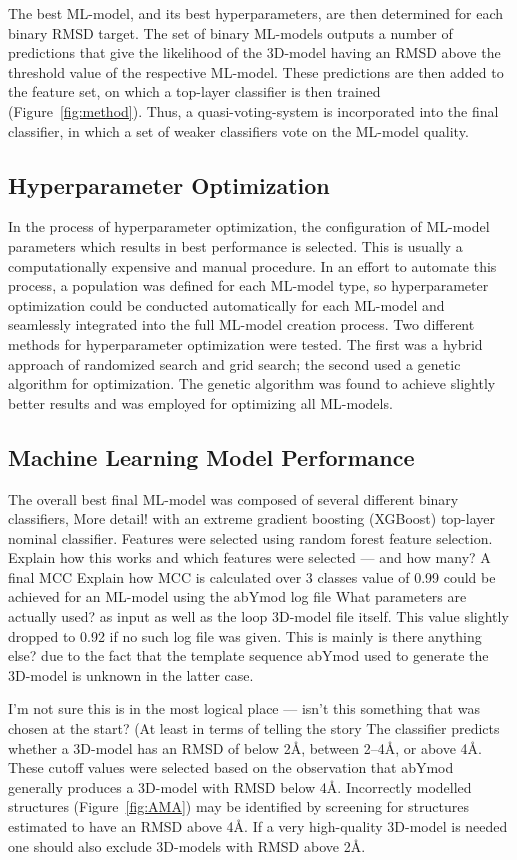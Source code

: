 \documentclass[12pt]{article}
\newcommand{\lilian}[1]{ {\color{red}{\bfseries Lilian:} #1}}
\begin{document}
The best ML-model, and its best hyperparameters, are then determined for
each binary RMSD target. The set of binary ML-models outputs a number of
predictions that give the likelihood of the 3D-model having an RMSD above
the threshold value of the respective ML-model. These predictions are
then added to the feature set, on which a top-layer classifier is then
trained (Figure~\ref{fig:method}). Thus, a quasi-voting-system is incorporated into the final
classifier, in which a set of weaker classifiers vote on the ML-model
quality.

\subsection{Hyperparameter Optimization}
In the process of hyperparameter optimization, the configuration of
ML-model parameters which results in best performance is selected. This
is usually a computationally expensive and manual procedure.
In an effort to automate this process, a population was defined for
each ML-model type, so hyperparameter optimization could be conducted
automatically for each ML-model and seamlessly integrated into the full
ML-model creation process. Two different methods for hyperparameter
optimization were tested. The first was a hybrid approach of randomized
search and grid search; the second used a genetic algorithm for
optimization. The genetic algorithm was found to achieve slightly
better results and was employed for optimizing all ML-models.

\subsection{Machine Learning Model Performance}
The overall best final ML-model was composed of several different binary
classifiers,\lilian{More detail!} with an extreme gradient boosting (XGBoost) top-layer
nominal classifier. Features were selected using random forest feature
selection.
\lilian{Explain how this works and which features were selected --- and how many?}
A final MCC\lilian{Explain how MCC is calculated over 3 classes} value of 0.99 could be achieved for an ML-model
using the abYmod log file \lilian{What parameters are actually used?} as input as well as the loop 3D-model file
itself. This value slightly dropped to 0.92 if no such log file was
given. This is mainly\lilian{is there anything else?} due to the fact that the template sequence
abYmod used to generate the 3D-model is unknown in the latter case.

\lilian{I'm not sure this is in the most logical place --- isn't this
  something that was chosen at the start? (At least in terms of
  telling the story}
The classifier predicts whether a 3D-model has an RMSD of below 2\AA,
between 2--4\AA, or above 4\AA. These cutoff values were selected
based on the observation that abYmod generally produces a 3D-model with
RMSD below 4\AA. Incorrectly modelled structures (Figure~\ref{fig:AMA}) may
be identified by screening for structures estimated to have an RMSD
above 4\AA. If a very high-quality 3D-model is needed one should also
exclude 3D-models with RMSD above 2\AA.
\end{document}
